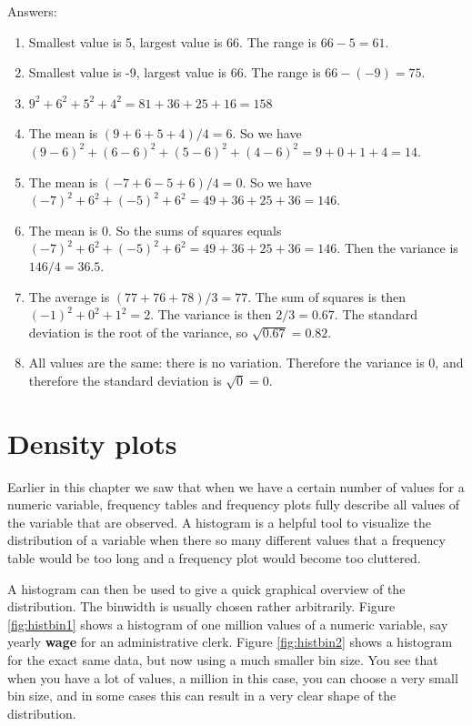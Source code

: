 \documentclass[]{book}\usepackage[]{graphicx}\usepackage[]{color}
\begin{document}
Answers:


\begin{enumerate}
\item Smallest value is 5, largest value is 66. The range is $66-5=61$.
\item Smallest value is -9, largest value is 66. The range is $66-(-9)=75$.
\item $9^2+6^2+5^2+4^2=81+36+25+16=158$
\item The mean is $(9+6+5+4)/4=6$. So we have $(9-6)^2+(6-6)^2+(5-6)^2+(4-6)^2=9+0+1+4=14$.
\item The mean is $(-7+6-5+6)/4=0$. So we have $(-7)^2+6^2+(-5)^2+6^2=49+36+25+36=146$.
\item The mean is 0. So the sums of squares equals $(-7)^2+6^2+(-5)^2+6^2=49+36+25+36=146$. Then the variance is $146/4=36.5$.
\item The average is $(77+76+78)/3=77$. The sum of squares is then $(-1)^2+0^2+1^2=2$. The variance is then $2/3=0.67$. The standard deviation is the root of the variance, so $\sqrt{0.67}=0.82$.
\item All values are the same: there is no variation. Therefore the variance is 0, and therefore the standard deviation is $\sqrt{0}=0$.
\end{enumerate}



\section{Density plots}

Earlier in this chapter we saw that when we have a certain number of values for a numeric variable, frequency tables and frequency plots fully describe all values of the variable that are observed. A histogram is a helpful tool to visualize the distribution of a variable when there so many different values that a frequency table would be too long and a frequency plot would become too cluttered. 


A histogram can then be used to give a quick graphical overview of the distribution. The binwidth is usually chosen rather arbitrarily. Figure \ref{fig:histbin1} shows a histogram of one million values of a numeric variable, say yearly \textbf{wage} for an administrative clerk. Figure \ref{fig:histbin2} shows a histogram for the exact same data, but now using a much smaller bin size. You see that when you have a lot of values, a million in this case, you can choose a very small bin size, and in some cases this can result in a very clear shape of the distribution.
\end{document}
